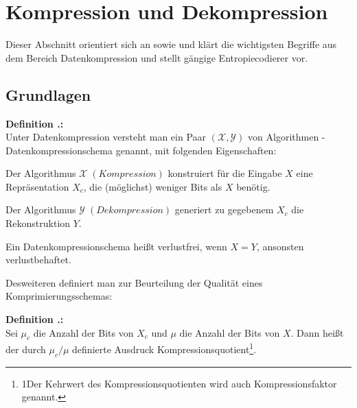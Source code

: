 \documentclass[a4paper,12pt]{article}
\newcommand{\X}{\mathcal X}
\newcommand{\Y}{\mathcal Y}
\newcounter{Definition}
\newcounter{Algorithmus}
\newenvironment{Definition}{
\bigskip
        
        \setlength{\parindent}{0pt}
        \addtocounter{Definition}{1}
        \textbf{\textsf{Definition \thesubsection.\theDefinition}:}\\}{
        \nopagebreak
        \vspace{-1.0ex}
        \bigskip
        
}
\begin{document}
\newpage
\section{Kompression und Dekompression}
Dieser Abschnitt orientiert sich an\cite{henne} sowie \cite{Lajmi} und klärt die wichtigsten Begriffe aus dem Bereich Datenkompression und stellt gängige Entropiecodierer vor.
\subsection{Grundlagen}
\begin{Definition}
Unter Datenkompression versteht man ein Paar $(\X,\Y)$ von Algorithmen - Datenkompressionschema genannt, mit folgenden Eigenschaften:

Der Algorithmus $\X \; \left(Kompression\right)$ konstruiert für die Eingabe $X$ eine Repräsentation $X_c$, die (möglichst) weniger Bits als $X$ benötig.
\par
Der Algorithmus  $\Y \; \left(Dekompression\right)$ generiert zu gegebenem $X_c$ die Rekonstruktion $Y$.
\par
 Ein Datenkompressionschema heißt verlustfrei, wenn $X = Y$, ansonsten verlustbehaftet.
\end{Definition}
Desweiteren definiert man zur Beurteilung der Qualität eines Komprimierungsschemas:
\begin{Definition}
Sei $\mu_c$ die Anzahl der Bits von $X_c$ und $\mu$ die Anzahl der Bits von $X$. Dann heißt der durch
$
\mu_c \slash \mu
$
definierte Ausdruck Kompressionsquotient\footnote{\footnotesize{1Der Kehrwert des Kompressionsquotienten wird auch Kompressionsfaktor genannt.}}.
\end{Definition}
\end{document}

